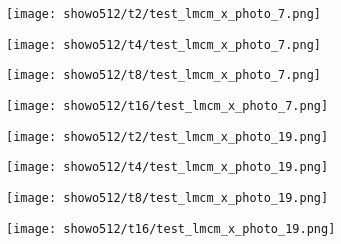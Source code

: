\begin{figure*}[htbp]
    
    \begin{minipage}{0.21\textwidth}
        \texttt{[image: showo512/t2/test\_lmcm\_x\_photo\_7.png]}
    \end{minipage}\hspace{0.1cm}%
    \begin{minipage}{0.21\textwidth}
        \texttt{[image: showo512/t4/test\_lmcm\_x\_photo\_7.png]}
    \end{minipage}\hspace{0.1cm}%
    \begin{minipage}{0.21\textwidth}
        \texttt{[image: showo512/t8/test\_lmcm\_x\_photo\_7.png]}
    \end{minipage}\hspace{0.1cm}%
    \begin{minipage}{0.21\textwidth}
        \texttt{[image: showo512/t16/test\_lmcm\_x\_photo\_7.png]}
    \end{minipage}\hspace{0.1cm}%

    \vspace{-0.1cm}

    \begin{minipage}{0.21\textwidth}
        \texttt{[image: showo512/t2/test\_lmcm\_x\_photo\_19.png]}
    \end{minipage}\hspace{0.1cm}%
    \begin{minipage}{0.21\textwidth}
        \texttt{[image: showo512/t4/test\_lmcm\_x\_photo\_19.png]}
    \end{minipage}\hspace{0.1cm}%
    \begin{minipage}{0.21\textwidth}
        \texttt{[image: showo512/t8/test\_lmcm\_x\_photo\_19.png]}
    \end{minipage}\hspace{0.1cm}%
    \begin{minipage}{0.21\textwidth}
        \texttt{[image: showo512/t16/test\_lmcm\_x\_photo\_19.png]}
    \end{minipage}\hspace{0.1cm}%

    \vspace{-0.1cm}



\end{figure*}
